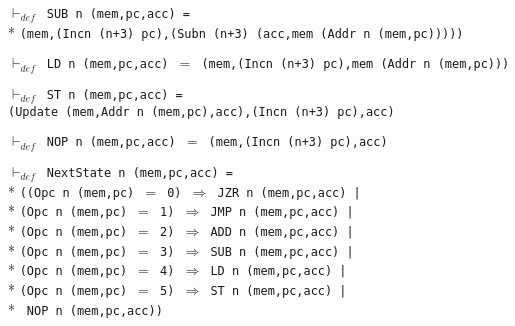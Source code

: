 \begin{normalsize}
\hspace*{\fill}
\begin{minipage}{17cm}
$\vdash_{def}$\verb" SUB n (mem,pc,acc) ="\\*
\verb"(mem,(Incn (n+3) pc),(Subn (n+3) (acc,mem (Addr n (mem,pc)))))"
\end{minipage}
\hspace*{\fill}

$\vdash_{def}$\verb" LD n (mem,pc,acc) "$=$\verb" (mem,(Incn (n+3) pc),mem (Addr n (mem,pc)))"

\hspace*{\fill}
\begin{minipage}{17cm}
$\vdash_{def}$\verb" ST n (mem,pc,acc) ="\\
\verb"(Update (mem,Addr n (mem,pc),acc),(Incn (n+3) pc),acc)"
\end{minipage}
\hspace*{\fill}

$\vdash_{def}$\verb" NOP n (mem,pc,acc) "$=$\verb" (mem,(Incn (n+3) pc),acc)"

\hspace*{\fill}
\begin{minipage}{17cm}
$\vdash_{def}$\verb" NextState n (mem,pc,acc) ="\\*
\verb"((Opc n (mem,pc) "$=$\verb" 0) "$\Rightarrow$\verb" JZR n (mem,pc,acc) |"\\*
\verb"(Opc n (mem,pc) "$=$\verb" 1) "$\Rightarrow$\verb" JMP n (mem,pc,acc) |"\\*
\verb"(Opc n (mem,pc) "$=$\verb" 2) "$\Rightarrow$\verb" ADD n (mem,pc,acc) |"\\*
\verb"(Opc n (mem,pc) "$=$\verb" 3) "$\Rightarrow$\verb" SUB n (mem,pc,acc) |"\\*
\verb"(Opc n (mem,pc) "$=$\verb" 4) "$\Rightarrow$\verb" LD n (mem,pc,acc) |"\\*
\verb"(Opc n (mem,pc) "$=$\verb" 5) "$\Rightarrow$\verb" ST n (mem,pc,acc) |"\\*
\verb" NOP n (mem,pc,acc))"
\end{minipage}
\hspace*{\fill}


\end{normalsize}
